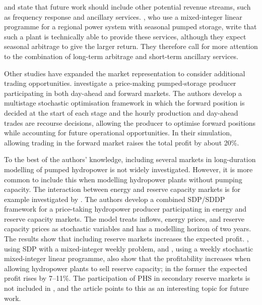 \textcite{alic2023} and \textcite{zhang2026seasonal} state that future work should include other potential revenue streams, such as frequency response and ancillary services. \textcite{zhang2026seasonal}, who use a mixed-integer linear programme for a regional power system with seasonal pumped storage, write that such a plant is technically able to provide these services, although they expect seasonal arbitrage to give the larger return. They therefore call for more attention to the combination of long-term arbitrage and short-term ancillary services.

Other studies have expanded the market representation to consider additional trading opportunities. \textcite{abgottspon2013} %
investigate a price-making pumped-storage producer participating in both day-ahead and forward markets. The authors develop a multistage stochastic optimisation framework in which the forward position is decided at the start of each stage and the hourly production and day-ahead trades are recourse decisions, allowing the producer to optimise forward positions while accounting for future operational opportunities. In their simulation, allowing trading in the forward market raises the total profit by about 20\%. %

To the best of the authors' knowledge, including several markets in long-duration modelling of pumped hydropower is not widely investigated. However, it is more common to include this when modelling hydropower plants without pumping capacity. The interaction between energy and reserve capacity markets is for example investigated by \textcite{helseth2016}. %
The authors develop a combined SDP/SDDP framework for a price-taking hydropower producer participating in energy and reserve capacity markets. The model treats inflows, energy prices, and reserve capacity prices as stochastic variables and has a modelling horizon of two years. The results show that including reserve markets increases the expected profit. \textcite{helseth2017iet}, using SDP with a mixed-integer weekly problem, and \textcite{chazarra2016}, %
using a weekly stochastic mixed-integer linear programme, also show that the profitability increases when allowing hydropower plants to sell reserve capacity; in the former the expected profit rises by 7--11\%. The participation of PHS in secondary reserve markets is not included in \textcite{chazarra2016}, and the article points to this as an interesting topic for future work.   %

